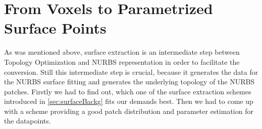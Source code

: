 \section{From Voxels to Parametrized Surface Points}
\label{sec:surfaceImpl}
As was mentioned above, surface extraction is an intermediate step between Topology Optimization and \ac{NURBS} representation in order to facilitate the conversion. Still this intermediate step is crucial, because it generates the data for the \ac{NURBS} surface fitting and generates the underlying topology of the \ac{NURBS} patches.
Firstly we had to find out, which one of the surface extraction schemes introduced in \autoref{sec:surfaceBackg} fits our demands best. Then we had to come up with a scheme providing a good patch distribution and parameter estimation for the datapoints.




